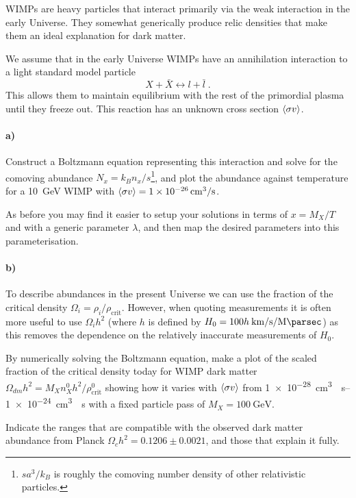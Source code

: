 \documentclass[12pt]{article}
\begin{document}
WIMPs are heavy particles that interact primarily via the weak interaction in the early Universe. They somewhat generically produce relic densities that make them an ideal explanation for dark matter.

We assume that in the early Universe WIMPs have an annihilation interaction to a light standard model particle
\begin{equation}
    X + \bar{X} \leftrightarrow l + \bar{l} \; .
\end{equation}
This allows them to maintain equilibrium with the rest of the primordial plasma until they freeze out. This reaction has an unknown cross section $\langle \sigma v \rangle$.

\paragraph{a)} Construct a Boltzmann equation representing this interaction and solve for the comoving abundance $N_x = k_B n_x / s$\footnote{$s a^3 / k_B$ is roughly the comoving number density of other relativistic particles.}, and plot the abundance against temperature for a \SI{10}{\GeV} WIMP with $\langle \sigma v \rangle = \SI{1e-26}{\centi\metre^3\per\second}$.

As before you may find it easier to setup your solutions in terms of $x = M_X / T$ and with a generic parameter $\lambda$, and then map the desired parameters into this parameterisation.

\paragraph{b)} To describe abundances in the present Universe we can use the fraction of the critical density $\Omega_i = \rho_i / \rho_\text{crit}$. However, when quoting measurements it is often more useful to use $\Omega_i h^2$ (where $h$ is defined by $H_0 = 100 h\: \si{\kilo\metre\per\second\per\mega\parsec}$) as this removes the dependence on the relatively inaccurate measurements of $H_0$.

By numerically solving the Boltzmann equation, make a plot of the scaled fraction of the critical density today for WIMP dark matter $\Omega_{dm} h^2 = M_X n_X^0 h^2 / \rho_\text{crit}^0$ showing how it varies with $\langle \sigma v \rangle$ from \SIrange{1e-28}{1e-24}{\centi\metre^3 \per\second} with a fixed particle pass of $M_X = \SI{100}{\GeV}$.

Indicate the ranges that are compatible with the observed dark matter abundance from Planck $\Omega_c h^2 = 0.1206 \pm 0.0021$, and those that explain it fully.
\end{document}
